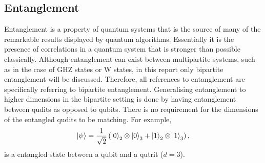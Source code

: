 \subsection{Entanglement}
Entanglement is a property of quantum systems that is the source of many of the remarkable results displayed by quantum algorithms.
Essentially it is the presence of correlations in a quantum system that is stronger than possible classically.
Although entanglement can exist between multipartite systems, such as in the case of GHZ states or W states, in this report only bipartite entanglement will be discussed.
Therefore, all references to entanglement are specifically referring to bipartite entanglement.
Generalising entanglement to higher dimensions in the bipartite setting is done by having entanglement between qudits as opposed to qubits.
There is no requirement for the dimensions of the entangled qudits to be matching.
For example,
\begin{equation}
    \ket{\psi} = \frac{1}{\sqrt{2}}\left(\ket{0}_2\otimes\ket{0}_3 + \ket{1}_2\otimes\ket{1}_3\right),
\end{equation}
is a entangled state between a qubit and a qutrit ($d=3$).

